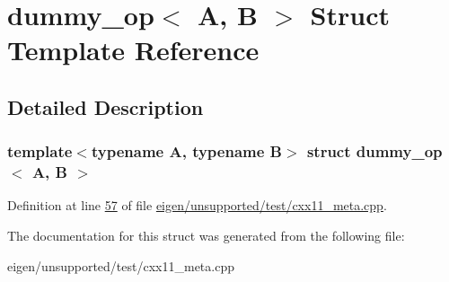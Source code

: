 \hypertarget{structdummy__op}{}\section{dummy\+\_\+op$<$ A, B $>$ Struct Template Reference}
\label{structdummy__op}


\subsection{Detailed Description}
\subsubsection*{template$<$typename A, typename B$>$\newline
struct dummy\+\_\+op$<$ A, B $>$}



Definition at line \hyperlink{eigen_2unsupported_2test_2cxx11__meta_8cpp_source_l00057}{57} of file \hyperlink{eigen_2unsupported_2test_2cxx11__meta_8cpp_source}{eigen/unsupported/test/cxx11\+\_\+meta.\+cpp}.



The documentation for this struct was generated from the following file\+:\begin{DoxyCompactItemize}
\item 
eigen/unsupported/test/cxx11\+\_\+meta.\+cpp\end{DoxyCompactItemize}
